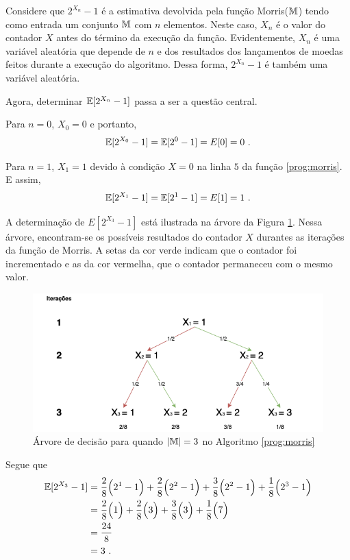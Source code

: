 Considere que $2^{X_n} - 1$ é a estimativa devolvida pela função Morris($\mathbb{M}$) tendo como entrada um conjunto $\mathbb{M}$ com $n$ elementos.
Neste caso, $X_n$ é o valor do contador $X$ antes do término da execução da função.
Evidentemente, $X_n$ é uma variável aleatória que depende de $n$ e dos resultados dos lançamentos de moedas feitos durante a execução do algoritmo.
Dessa forma, $2^{X_n} - 1$ é também uma variável aleatória.

Agora, determinar $\mathbb{E}[2^{X_n} - 1]$ passa a ser a questão central.

Para $n = 0$, $X_0 = 0$ e portanto,
\[ \mathbb{E}[2^{X_0} - 1] = \mathbb{E}[2^0 - 1] = E[0] = 0 \ .\]

Para $n = 1$, $X_1 = 1$ devido à condição $X = 0$ na linha $5$ da função \ref{prog:morris}. E assim, 
\[ \Ebb[2^{X_1} - 1] = \Ebb[2^1 - 1] = E[1] = 1 \ .\]

A determinação de $E[2^{X_3} - 1]$ está ilustrada na árvore da Figura \ref{fig:morris-tree}.
Nessa árvore, encontram-se os possíveis resultados do contador $X$ durantes as iterações da função de Morris.
A setas da cor verde indicam que o contador foi incrementado e as da cor vermelha, que o contador permaneceu com o mesmo valor.

\begin{figure}
  \centering
  \includegraphics[scale=0.50]{figuras/morris-tree.png}
	\caption{Árvore de decisão para quando $|\mathbb{M}| = 3$ no Algoritmo \ref{prog:morris}}\label{fig:morris-tree}
\end{figure}

Segue que
\begin{align*}
  \mathbb{E}[2^{X_3} - 1] 
    &= \frac{2}{8} \Big(2^1 - 1\Big) + \frac{2}{8} \Big(2^2 - 1\Big) + \frac{3}{8}\Big(2^2 - 1\Big) + \frac{1}{8} \Big(2^3 - 1\Big) \\
    &= \frac{2}{8} \Big(1\Big) + \frac{2}{8} \Big(3\Big) + \frac{3}{8} \Big(3\Big) + \frac{1}{8} \Big(7\Big) \\
    &= \frac{24}{8} \\
    &= 3 \ .
\end{align*}

